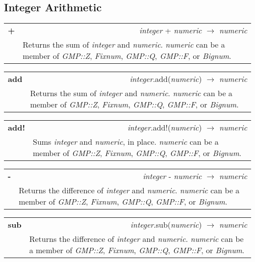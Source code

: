 \documentclass[pdftex,10pt]{article}
\newlength{\methwidth}
\newlength{\defnwidth}
\begin{document}
\subsection{Integer Arithmetic}

\begin{tabular}{p{\methwidth} l r}
\toprule
\textbf{+} & & \textit{integer} + \textit{numeric} $\rightarrow$ \textit{numeric} \\
\cmidrule(r){2-3}
& \multicolumn{2}{p{\defnwidth}}{
  Returns the sum of \textit{integer} and \textit{numeric}. \textit{numeric} can be a
  member of \textit{GMP::Z}, \textit{Fixnum}, \textit{GMP::Q}, \textit{GMP::F}, or
  \textit{Bignum}.
}
\end{tabular}
\newline\newline

\begin{tabular}{p{\methwidth} l r}
\toprule
\textbf{add} & & \textit{integer}.add(\textit{numeric}) $\rightarrow$ \textit{numeric} \\
\cmidrule(r){2-3}
& \multicolumn{2}{p{\defnwidth}}{
  Returns the sum of \textit{integer} and \textit{numeric}. \textit{numeric} can be a
  member of \textit{GMP::Z}, \textit{Fixnum}, \textit{GMP::Q}, \textit{GMP::F}, or
  \textit{Bignum}.
}
\end{tabular}
\newline\newline

\begin{tabular}{p{\methwidth} l r}
\toprule
\textbf{add!} & & \textit{integer}.add!(\textit{numeric}) $\rightarrow$
\textit{numeric} \\
\cmidrule(r){2-3}
& \multicolumn{2}{p{\defnwidth}}{
  Sums \textit{integer} and \textit{numeric}, in place. \textit{numeric} can be a
  member of \textit{GMP::Z}, \textit{Fixnum}, \textit{GMP::Q}, \textit{GMP::F}, or
  \textit{Bignum}.
}
\end{tabular}
\newline\newline

\begin{tabular}{p{\methwidth} l r}
\toprule
\textbf{-} & & \textit{integer} - \textit{numeric} $\rightarrow$ \textit{numeric} \\
\cmidrule(r){2-3}
& \multicolumn{2}{p{\defnwidth}}{
  Returns the difference of \textit{integer} and \textit{numeric}. \textit{numeric} can be a
  member of \textit{GMP::Z}, \textit{Fixnum}, \textit{GMP::Q}, \textit{GMP::F}, or
  \textit{Bignum}.
}
\end{tabular}
\newline\newline

\begin{tabular}{p{\methwidth} l r}
\toprule
\textbf{sub} & & \textit{integer}.sub(\textit{numeric}) $\rightarrow$ \textit{numeric} \\
\cmidrule(r){2-3}
& \multicolumn{2}{p{\defnwidth}}{
  Returns the difference of \textit{integer} and \textit{numeric}. \textit{numeric} can be a
  member of \textit{GMP::Z}, \textit{Fixnum}, \textit{GMP::Q}, \textit{GMP::F}, or
  \textit{Bignum}.
}
\end{tabular}
\end{document}
